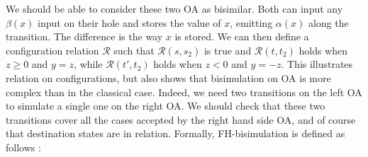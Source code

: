 \documentclass[runningheads]{llncs}
\begin{document}
We should be able to consider these two OA as bisimilar. Both can input any $\beta(x)$ input on their hole and stores the value of $x$, emitting $\alpha(x)$ along the transition.
The difference is the way $x$ is stored. We can then define a configuration relation $\mathcal{R}$ such that $\mathcal{R}(s,s_2)$ is true and $\mathcal{R}(t,t_2)$ holds when $z\geq 0$ and $y=z$, while $\mathcal{R}(t',t_2)$ holds when $z< 0$ and $y=-z$. This illustrates relation on configurations, but also shows that bisimulation on OA is more complex than in the classical case. Indeed, we need two transitions on the left OA to simulate a single one on the right OA. We should check that these two transitions cover all the cases accepted by the right hand side OA, and of course that destination states are in relation. Formally, FH-bisimulation is defined as follows \cite{AMHEEMA:2023}:
\end{document}
